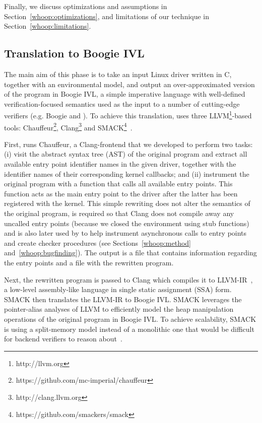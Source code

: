 Finally, we discuss optimizations and assumptions in Section~\ref{whoop:optimizations}, and limitations of our technique in Section~\ref{whoop:limitations}.

\subsection{Translation to Boogie IVL}
\label{whoop:translation}

The main aim of this phase is to take an input Linux driver written in C, together with an environmental model, and output an over-approximated version of the program in Boogie IVL, a simple imperative language with well-defined verification-focused semantics used as the input to a number of cutting-edge verifiers (e.g. Boogie and \corral). To achieve this translation, \whoop uses three LLVM\footnote{http://llvm.org}-based tools: Chauffeur\footnote{https://github.com/mc-imperial/chauffeur}, Clang\footnote{http://clang.llvm.org} and SMACK\footnote{https://github.com/smackers/smack}~\cite{rakamaric2014smack}.

First, \whoop runs Chauffeur, a Clang-frontend that we developed to perform two tasks: (i) visit the abstract syntax tree (AST) of the original program and extract all available entry point identifier names in the given driver, together with the identifier names of their corresponding kernel callbacks; and (ii) instrument the original program with a function that calls all available entry points. This function acts as the main entry point to the driver after the latter has been registered with the kernel. This simple rewriting does not alter the semantics of the original program, is required so that Clang does not compile away any uncalled entry points (because we closed the environment using stub functions) and is also later used by \whoop to help instrument asynchronous calls to entry points and create checker procedures (see Sections~\ref{whoop:method} and~\ref{whoop:bugfinding}). The output is a file that contains information regarding the entry points and a file with the rewritten program.

Next, the rewritten program is passed to Clang which compiles it to LLVM-IR~\cite{lattner2004llvm}, a low-level assembly-like language in single static assignment (SSA) form. SMACK then translates the LLVM-IR to Boogie IVL. SMACK leverages the pointer-alias analyses of LLVM to efficiently model the heap manipulation operations of the original program in Boogie IVL. To achieve scalability, SMACK is using a split-memory model instead of a monolithic one that would be difficult for backend verifiers to reason about~\cite{rakamaric2009scalable}.

